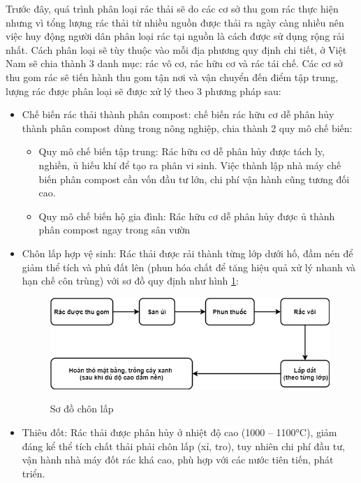 Trước đây, quá trình phân loại rác thải sẽ do các cơ sở thu gom rác thực hiện nhưng vì tổng lượng rác thải từ nhiều nguồn được thải ra ngày càng nhiều nên việc huy động người dân phân loại rác tại nguồn là cách được sử dụng rộng rải nhất. Cách phân loại sẽ tùy thuộc vào mỗi địa phương quy định chi tiết, ở Việt Nam sẽ chia thành 3 danh mục: rác vô cơ, rác hữu cơ và rác tái chế. Các cơ sở thu gom rác sẽ tiến hành thu gom tận nơi và vận chuyển đến điểm tập trung, lượng rác được phân loại sẽ được xử lý theo 3 phương pháp sau:
\begin{itemize}
    \item Chế biến rác thải thành phân compost: chế biến rác hữu cơ dễ phân hủy thành phân compost dùng trong nông nghiệp, chia thành 2 quy mô chế biến:
        \begin{itemize}
            \item Quy mô chế biến tập trung: Rác hữu cơ dễ phân hủy được tách ly, nghiền, ủ hiếu khí để tạo ra phân vi sinh. Việc thành lập nhà máy chế biến phân compost cần vốn đầu tư lớn, chi phí vận hành cũng tương đối cao.
            \item  Quy mô chế biến hộ gia đình: Rác hữu cơ dễ phân hủy được ủ thành phân compost ngay trong sân vườn
        \end{itemize}

    \item Chôn lấp hợp vệ sinh: Rác thải được rải thành từng lớp dưới hố, đầm nén để giảm thể tích và phủ đất lên (phun  hóa chất để tăng hiệu quả xử lý nhanh và hạn chế côn trùng) với sơ đồ quy định như hình \ref{fig:so_do_chon_lap}:
    
        \begin{figure}[H]
            \centering            
            \includegraphics[width=\textwidth]{images/SoDoChonLap.png}
            \caption{Sơ đồ chôn lấp} \cite{trashclassification}
            \label{fig:so_do_chon_lap}
        \end{figure}

    \item Thiêu đốt: Rác thải được phân hủy ở nhiệt độ cao (1000 – 1100°C), giảm đáng kể thể tích chất thải phải chôn lấp (xỉ, tro), tuy nhiên chi phí đầu tư, vận hành nhà máy đốt rác khá cao, phù hợp với các nước tiên tiến, phát triển. 
   

\end{itemize}
